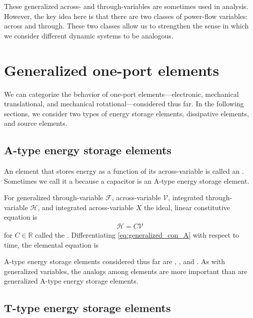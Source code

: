 \documentclass[dynamic_systems.tex]{subfiles}
\begin{document}
These generalized across- and through-variables are sometimes used in analysis.
However, the key idea here is that there are two classes of power-flow variables: across and through.
These two classes allow us to strengthen the sense in which we consider different dynamic systems to be analogous.
\tags{}

\section{Generalized one-port elements}
\tags{}

We can categorize the behavior of one-port elements---electronic, mechanical translational, and mechanical rotational---considered thus far.
In the following sections, we consider two types of energy storage elements, dissipative elements, and source elements.
\tags{}

\subsection{A-type energy storage elements}

An element that stores energy as a function of its across-variable is called an .
Sometimes we call it a  because a capacitor is an A-type energy storage element.

For generalized through-variable $\mathcal{F}$, across-variable $\mathcal{V}$, integrated through-variable $\mathcal{H}$, and integrated across-variable $X$ the ideal, linear constitutive equation is
\begin{align}\label{eq:generalized_con_A}
	\mathcal{H} = C \mathcal{V}
\end{align}
for $C\in\mathbb{R}$ called the .
Differentiating \autoref{eq:generalized_con_A} with respect to time, the elemental equation is

A-type energy storage elements considered thus far are , , and .
As with generalized variables, the analogs among elements are more important than are generalized A-type energy storage elements.

\subsection{T-type energy storage elements}
\end{document}

